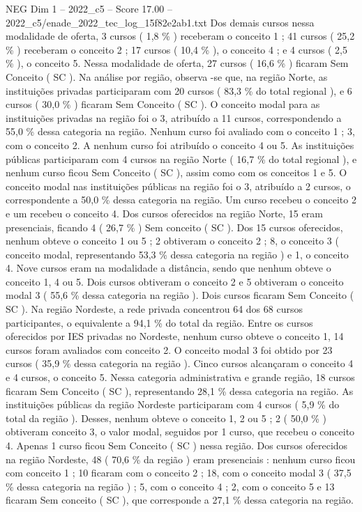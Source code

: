\begin{textsample}{NEG Dim 1 – 2022\_c5 – Score 17.00 – 2022\_c5/enade\_2022\_tec\_log\_15f82e2ab1.txt}
Dos demais cursos nessa modalidade de oferta, 3 cursos ( 1,8 \% ) receberam o conceito 1 ; 41 cursos ( 25,2 \% ) receberam o conceito 2 ; 17 cursos ( 10,4 \% ), o conceito 4 ; e 4 cursos ( 2,5 \% ), o conceito 5.
Nessa modalidade de oferta, 27 cursos ( 16,6 \% ) ficaram Sem Conceito ( SC ).
Na análise por região, observa -se que, na região Norte, as instituições privadas participaram com 20 cursos ( 83,3 \% do total regional ), e 6 cursos ( 30,0 \% ) ficaram Sem Conceito ( SC ).
O conceito modal para as instituições privadas na região foi o 3, atribuído a 11 cursos, correspondendo a 55,0 \% dessa categoria na região.
Nenhum curso foi avaliado com o conceito 1 ; 3, com o conceito 2.
A nenhum curso foi atribuído o conceito 4 ou 5.
As instituições públicas participaram com 4 cursos na região Norte ( 16,7 \% do total regional ), e nenhum curso ficou Sem Conceito ( SC ), assim como com os conceitos 1 e 5.
O conceito modal nas instituições públicas na região foi o 3, atribuído a 2 cursos, o correspondente a 50,0 \% dessa categoria na região.
Um curso recebeu o conceito 2 e um recebeu o conceito 4.
Dos cursos oferecidos na região Norte, 15 eram presenciais, ficando 4 ( 26,7 \% ) Sem conceito ( SC ).
Dos 15 cursos oferecidos, nenhum obteve o conceito 1 ou 5 ; 2 obtiveram o conceito 2 ; 8, o conceito 3 ( conceito modal, representando 53,3 \% dessa categoria na região ) e 1, o conceito 4.
Nove cursos eram na modalidade a distância, sendo que nenhum obteve o conceito 1, 4 ou 5.
Dois cursos obtiveram o conceito 2 e 5 obtiveram o conceito modal 3 ( 55,6 \% dessa categoria na região ).
Dois cursos ficaram Sem Conceito ( SC ).
Na região Nordeste, a rede privada concentrou 64 dos 68 cursos participantes, o equivalente a 94,1 \% do total da região.
Entre os cursos oferecidos por IES privadas no Nordeste, nenhum curso obteve o conceito 1, 14 cursos foram avaliados com conceito 2.
O conceito modal 3 foi obtido por 23 cursos ( 35,9 \% dessa categoria na região ).
Cinco cursos alcançaram o conceito 4 e 4 cursos, o conceito 5.
Nessa categoria administrativa e grande região, 18 cursos ficaram Sem Conceito ( SC ), representando 28,1 \% dessa categoria na região.
As instituições públicas da região Nordeste participaram com 4 cursos ( 5,9 \% do total da região ).
Desses, nenhum obteve o conceito 1, 2 ou 5 ; 2 ( 50,0 \% ) obtiveram conceito 3, o valor modal, seguidos por 1 curso, que recebeu o conceito 4.
Apenas 1 curso ficou Sem Conceito ( SC ) nessa região.
Dos cursos oferecidos na região Nordeste, 48 ( 70,6 \% da região ) eram presenciais : nenhum curso ficou com conceito 1 ; 10 ficaram com o conceito 2 ; 18, com o conceito modal 3 ( 37,5 \% dessa categoria na região ) ; 5, com o conceito 4 ; 2, com o conceito 5 e 13 ficaram Sem conceito ( SC ), que corresponde a 27,1 \% dessa categoria na região.

\end{textsample}
